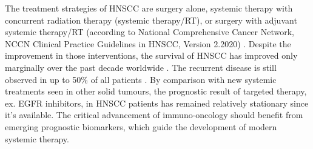 \documentclass[12pt, a4paper]{article}
\begin{document}
The treatment strategies of HNSCC are surgery alone, systemic therapy with concurrent radiation therapy (systemic therapy/RT), or surgery with adjuvant systemic therapy/RT (according to National Comprehensive Cancer Network, NCCN Clinical Practice Guidelines in HNSCC, Version 2.2020) \citep{Pfister2020a}. Despite the improvement in those interventions, the survival of HNSCC has improved only marginally over the past decade worldwide \citep{hpa2019}.
The recurrent disease is still observed in up to 50\% of all patients \citep{Forastiere2001,Warnakulasuriya2009}.
By comparison with new systemic treatments seen in other solid tumours, the prognostic result of targeted therapy, ex. EGFR inhibitors, in HNSCC patients has remained relatively stationary since it's available\citep{Argiris2015a}.
The critical advancement of immuno-oncology should benefit from emerging prognostic biomarkers, which guide the development of modern systemic therapy.





\end{document}
